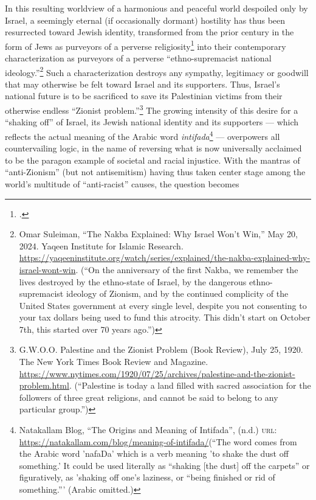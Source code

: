 \documentclass[../unravbook.tex]{subfiles}
\begin{document}
\begin{spacing}{1.2}
In this resulting worldview of a harmonious and peaceful world despoiled only by Israel, a seemingly eternal (if occasionally dormant) hostility has thus been resurrected toward Jewish identity, transformed from the prior century in the form of Jews as purveyors of a perverse religiosity\footcite[4 (``In Christian Europe, Jews and Judaism had been defined in terms of religion, not ethnicity, habitus, or civilization. But even as a (superseded) religion Judaism was having a hard time in nineteenth-century Germany. Its collective legalism was framed as the antithesis of personal religiosity (\textit{Glauben} and \textit{Innerlichkeit}), its covenantal tribalism as incompatible with the principles ofHumanität. And whereas Protestant theologians could muster a certain regard forthe pristine Hebraismus of the biblical prophets, they had no sympathy whatsoever for `degenerate' post-exilic \textit{Judenthum}.)'']{Zwiep-2022} into their contemporary characterization as purveyors of a perverse \enquote{ethno-supremacist national ideology.}\footnote{Omar Suleiman, \enquote{The Nakba Explained: Why Israel Won't Win,} May 20, 2024. Yaqeen Institute for Islamic Research. \url{https://yaqeeninstitute.org/watch/series/explained/the-nakba-explained-why-israel-wont-win}. (\enquote{On the anniversary of the first Nakba, we remember the lives destroyed by the ethno-state of Israel, by the dangerous ethno-supremacist ideology of Zionism, and by the continued complicity of the United States government at every single level, despite you not consenting to your tax dollars being used to fund this atrocity. This didn't start on October 7th, this started over 70 years ago.})} Such a characterization destroys any sympathy, legitimacy or goodwill that may otherwise be felt toward Israel and its supporters. Thus, Israel's national future is to be sacrificed to save its Palestinian victims from their otherwise endless \enquote{Zionist problem.}\footnote{G.W.O.O. Palestine and the Zionist Problem (Book Review), July 25, 1920. The New York Times Book Review and Magazine. \url{https://www.nytimes.com/1920/07/25/archives/palestine-and-the-zionist-problem.html}. (\enquote{Palestine is today a land filled with sacred association for the followers of three great religions, and cannot be said to belong to any particular group.})} The growing intensity of this desire for a \enquote{shaking off} of Israel, its Jewish national identity and its supporters ---  which reflects the actual meaning of the Arabic word \textit{intifada}\footnote{Natakallam Blog, \enquote{The Origins and Meaning of Intifada}, (n.d.)  \textsc{url: } \url{https://natakallam.com/blog/meaning-of-intifada/}(``The word comes from the Arabic word 'nafaDa' which is a verb meaning 'to shake the dust off something.' It could be used literally as ``shaking [the dust] off the carpets'' or figuratively, as 'shaking off one's laziness, or ``being finished or rid of something.''' (Arabic omitted.)} --- overpowers all countervailing logic, in the name of reversing what is now universally acclaimed to be  the paragon example of societal and racial injustice. With the mantras of \enquote{anti-Zionism} (but not antisemitism) having thus taken center stage among the world's multitude of \enquote{anti-racist} causes, the question becomes 
\end{spacing}
\end{document}
